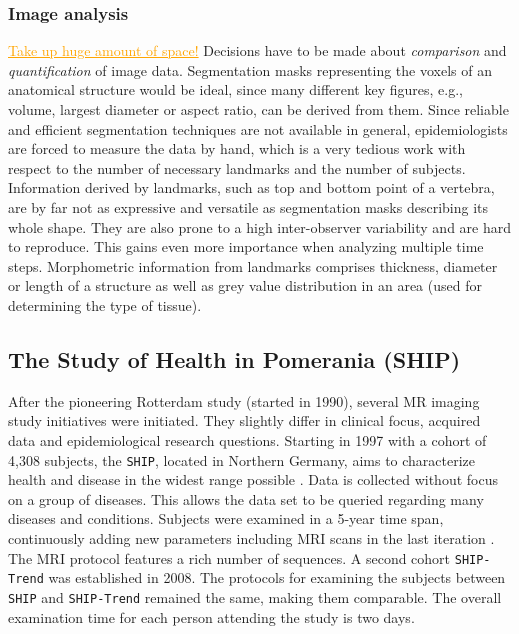 \documentclass[journal]{style/vgtc} 			          %
\newcommand{\com}[1]{\textcolor{orange}{\uline{#1}}}
\begin{document}
\subsubsection{Image analysis} \label{ImageAnalysis}
\com{Take up huge amount of space!}
%
Decisions have to be made about \emph{comparison} and \emph{quantification} of image data.
%
Segmentation masks representing the voxels of an anatomical structure would be ideal, since many different key figures, e.g., volume, largest diameter or aspect ratio, can be derived from them.
%
Since reliable and efficient segmentation techniques are not available in general, epidemiologists are forced to measure the data by hand, which is a very tedious work with respect to the number of necessary landmarks and the number of subjects.
%
Information derived by landmarks, such as top and bottom point of a vertebra, are by far not as expressive and versatile as segmentation masks describing its whole shape.
%
They are also prone to a high inter-observer variability and are hard to reproduce.
%
This gains even more importance when analyzing multiple time steps.
%
Morphometric information from landmarks comprises thickness, diameter or length of a structure as well as grey value distribution in an area (used for determining the type of tissue).


\subsection{The Study of Health in Pomerania (SHIP)}
After the pioneering Rotterdam study (started in 1990), several MR imaging study initiatives were initiated.
%
They slightly differ in clinical focus, acquired data and epidemiological research questions.
%
Starting in 1997 with a cohort of 4,308 subjects, the \texttt{SHIP}, located in Northern Germany, aims to characterize health and disease in the widest range possible \cite{Volzke2011}.
%
Data is collected without focus on a group of diseases.
%
This allows the data set to be queried regarding many diseases and conditions.
%
Subjects were examined in a 5-year time span, continuously adding new parameters including MRI scans in the last iteration \cite{Hegenscheid2009}.
%
The MRI protocol features a rich number of sequences.
%
A second cohort \texttt{SHIP-Trend} was established in 2008.
%
The protocols for examining the subjects between \texttt{SHIP} and \texttt{SHIP-Trend} remained the same, making them comparable.
%
The overall examination time for each person attending the study is two days.
\end{document}
